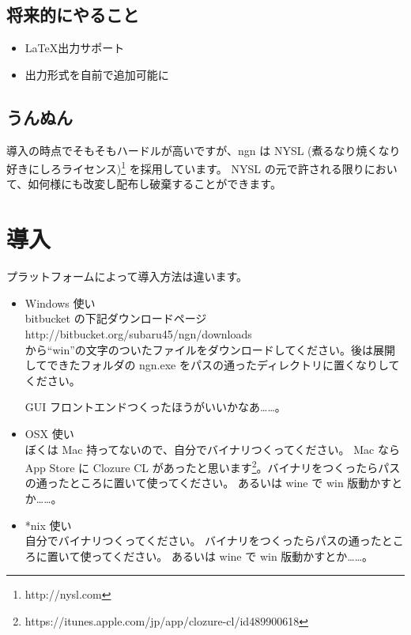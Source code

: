 \documentclass[a4j]{jsarticle}
\begin{document}
\subsection{将来的にやること}

\begin{itemize}
  \item \LaTeX 出力サポート
  \item 出力形式を自前で追加可能に
\end{itemize}

\subsection{うんぬん}
導入の時点でそもそもハードルが高いですが、ngn は NYSL (煮るなり焼くなり好きにしろライセンス)\footnote{http://nysl.com} を採用しています。
NYSL の元で許される限りにおいて、如何様にも改変し配布し破棄することができます。


\section{導入}

プラットフォームによって導入方法は違います。

\begin{itemize}
\item Windows 使い\\
  bitbucket の下記ダウンロードページ \\
  http://bitbucket.org/subaru45/ngn/downloads \\
から``win''の文字のついたファイルをダウンロードしてください。後は展開してできたフォルダの ngn.exe をパスの通ったディレクトリに置くなりしてください。

GUI フロントエンドつくったほうがいいかなあ……。\\

\item OSX 使い\\
  ぼくは Mac 持ってないので、自分でバイナリつくってください。
  Mac なら App Store に Clozure CL があったと思います\footnote{https://itunes.apple.com/jp/app/clozure-cl/id489900618}。バイナリをつくったらパスの通ったところに置いて使ってください。
  あるいは wine で win 版動かすとか……。\\

\item *nix 使い\\
  自分でバイナリつくってください。
  バイナリをつくったらパスの通ったところに置いて使ってください。
  あるいは wine で win 版動かすとか……。\\

\end{itemize}
\end{document}
